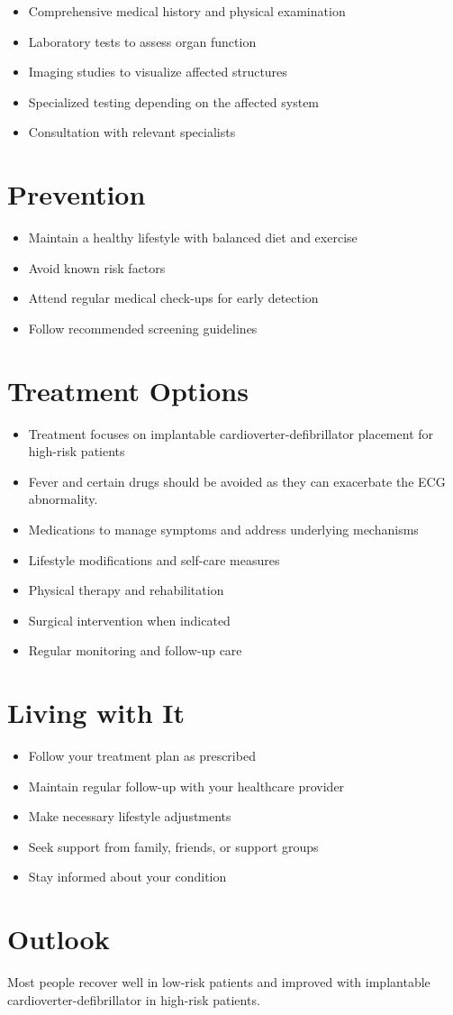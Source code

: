 \begin{itemize}[noitemsep]
  \item Comprehensive medical history and physical examination
  \item Laboratory tests to assess organ function
  \item Imaging studies to visualize affected structures
  \item Specialized testing depending on the affected system
  \item Consultation with relevant specialists
\end{itemize}
\section{Prevention}
\begin{itemize}[noitemsep]
  \item Maintain a healthy lifestyle with balanced diet and exercise
  \item Avoid known risk factors
  \item Attend regular medical check-ups for early detection
  \item Follow recommended screening guidelines
\end{itemize}
\section{Treatment Options}
\begin{itemize}[noitemsep]
  \item Treatment focuses on implantable cardioverter-defibrillator placement for high-risk patients
  \item Fever and certain drugs should be avoided as they can exacerbate the ECG abnormality.
  \item Medications to manage symptoms and address underlying mechanisms
  \item Lifestyle modifications and self-care measures
  \item Physical therapy and rehabilitation
  \item Surgical intervention when indicated
  \item Regular monitoring and follow-up care
\end{itemize}
\section{Living with It}
\begin{itemize}[noitemsep]
  \item Follow your treatment plan as prescribed
  \item Maintain regular follow-up with your healthcare provider
  \item Make necessary lifestyle adjustments
  \item Seek support from family, friends, or support groups
  \item Stay informed about your condition
\end{itemize}
\section{Outlook}
Most people recover well in low-risk patients and improved with implantable cardioverter-defibrillator in high-risk patients.
